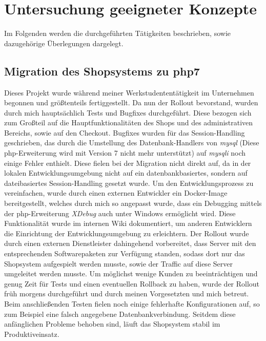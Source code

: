 \chapter{Untersuchung geeigneter Konzepte}\label{ch:taetigkeiten}
Im Folgenden werden die durchgeführten Tätigkeiten beschrieben, sowie dazugehörige Überlegungen dargelegt.



\section{Migration des Shopsystems zu php7}
Dieses Projekt wurde während meiner Werkstudententätigkeit im Unternehmen begonnen und größtenteils fertiggestellt. 
Da nun der Rollout bevorstand, wurden durch mich hauptsächlich Tests und Bugfixes durchgeführt. 
Diese bezogen sich zum Großteil auf die Hauptfunktionalitäten des Shops und des administrativen Bereichs, sowie auf den Checkout. 
Bugfixes wurden für das Session-Handling geschrieben, das durch die Umstellung des Datenbank-Handlers von \textit{mysql} 
(Diese php-Erweiterung wird mit Version 7 nicht mehr unterstützt) auf \textit{mysqli} noch einige Fehler enthielt. 
Diese fielen bei der Migration nicht direkt auf, da in der lokalen Entwicklungsumgebung nicht auf ein datenbankbasiertes, sondern auf dateibasiertes 
Session-Handling gesetzt wurde. Um den Entwicklungsprozess zu vereinfachen, wurde durch einen externen Entwickler ein Docker-Image bereitgestellt, 
welches durch mich so angepasst wurde, dass ein Debugging mittels der php-Erweiterung \textit{XDebug} auch unter Windows ermöglicht wird. 
Diese Funktionalität wurde im internen Wiki dokumentiert, um anderen Entwicklern die Einrichtung der Entwicklungsumgebung zu erleichtern.
Der Rollout wurde durch einen externen Dienstleister dahingehend vorbereitet, dass Server mit den entsprechenden Softwarepaketen zur Verfügung standen, sodass 
dort nur das Shopsystem aufgespielt werden musste, sowie der Traffic auf diese Server umgeleitet werden musste.
Um möglichst wenige Kunden zu beeinträchtigen und genug Zeit für Tests und einen eventuellen Rollback zu haben, wurde der Rollout früh morgens durchgeführt
und durch meinen Vorgesetzten und mich betreut. Beim anschließenden Testen fielen noch einige fehlerhafte Konfigurationen auf, so zum Beispiel eine 
falsch angegebene Datenbankverbindung. Seitdem diese anfänglichen Probleme behoben sind, läuft das Shopsystem stabil im Produktiveinsatz.


